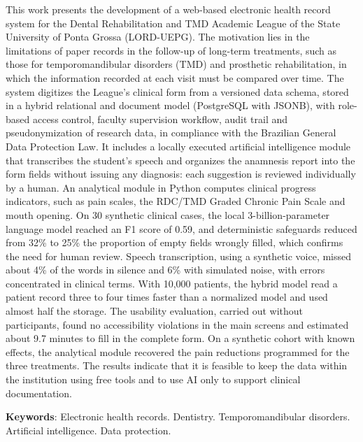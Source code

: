 This work presents the development of a web-based electronic health record system for the Dental Rehabilitation and TMD Academic League of the State University of Ponta Grossa (LORD-UEPG). The motivation lies in the limitations of paper records in the follow-up of long-term treatments, such as those for temporomandibular disorders (TMD) and prosthetic rehabilitation, in which the information recorded at each visit must be compared over time. The system digitizes the League's clinical form from a versioned data schema, stored in a hybrid relational and document model (PostgreSQL with JSONB), with role-based access control, faculty supervision workflow, audit trail and pseudonymization of research data, in compliance with the Brazilian General Data Protection Law. It includes a locally executed artificial intelligence module that transcribes the student's speech and organizes the anamnesis report into the form fields without issuing any diagnosis: each suggestion is reviewed individually by a human. An analytical module in Python computes clinical progress indicators, such as pain scales, the RDC/TMD Graded Chronic Pain Scale and mouth opening. On 30 synthetic clinical cases, the local 3-billion-parameter language model reached an F1 score of 0.59, and deterministic safeguards reduced from 32\% to 25\% the proportion of empty fields wrongly filled, which confirms the need for human review. Speech transcription, using a synthetic voice, missed about 4\% of the words in silence and 6\% with simulated noise, with errors concentrated in clinical terms. With 10,000 patients, the hybrid model read a patient record three to four times faster than a normalized model and used almost half the storage. The usability evaluation, carried out without participants, found no accessibility violations in the main screens and estimated about 9.7 minutes to fill in the complete form. On a synthetic cohort with known effects, the analytical module recovered the pain reductions programmed for the three treatments. The results indicate that it is feasible to keep the data within the institution using free tools and to use AI only to support clinical documentation.

\vspace{\onelineskip}

\noindent\textbf{Keywords}: Electronic health records. Dentistry. Temporomandibular disorders. Artificial intelligence. Data protection.

